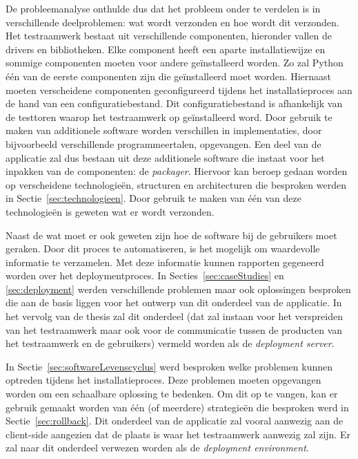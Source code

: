 De probleemanalyse onthulde dus dat het probleem onder te verdelen is in verschillende deelproblemen: wat wordt verzonden en hoe wordt dit verzonden.
Het testraamwerk bestaat uit verschillende componenten, hieronder vallen de drivers en bibliotheken.
Elke component heeft een aparte installatiewijze en sommige componenten moeten voor andere geïnstalleerd worden.
Zo zal Python één van de eerste componenten zijn die geïnstalleerd moet worden.
Hiernaast moeten verscheidene componenten geconfigureerd tijdens het installatieproces aan de hand van een configuratiebestand.
Dit configuratiebestand is afhankelijk van de testtoren waarop het testraamwerk op geïnstalleerd word.
Door gebruik te maken van additionele software worden verschillen in implementaties, door bijvoorbeeld verschillende programmeertalen, opgevangen.
Een deel van de applicatie zal dus bestaan uit deze additionele software die instaat voor het inpakken van de componenten: de \emph{packager}.
Hiervoor kan beroep gedaan worden op verscheidene technologieën, structuren en architecturen die besproken werden in Sectie~\ref{sec:technologieen}.
Door gebruik te maken van één van deze technologieën is geweten wat er wordt verzonden.

Naast de wat moet er ook geweten zijn hoe de software bij de gebruikers moet geraken.
Door dit proces te automatiseren, is het mogelijk om waardevolle informatie te verzamelen.
Met deze informatie kunnen rapporten gegeneerd worden over het deploymentproces.
In Secties~\ref{sec:caseStudies} en \ref{sec:deployment} werden verschillende problemen maar ook oplossingen besproken die aan de basis liggen voor het ontwerp van dit onderdeel van de applicatie. 
In het vervolg van de thesis zal dit onderdeel (dat zal instaan voor het verspreiden van het testraamwerk maar ook voor de communicatie tussen de producten van het testraamwerk en de gebruikers) vermeld worden als de \emph{deployment server}.

In Sectie~\ref{sec:softwareLevenscyclus} werd besproken welke problemen kunnen optreden tijdens het installatieproces.
Deze problemen moeten opgevangen worden om een schaalbare oplossing te bedenken.
Om dit op te vangen, kan er gebruik gemaakt worden van één (of meerdere) strategieën die besproken werd in Sectie~\ref{sec:rollback}.
Dit onderdeel van de applicatie zal vooral aanwezig aan de client-side aangezien dat de plaats is waar het testraamwerk aanwezig zal zijn.
Er zal naar dit onderdeel verwezen worden als de \emph{deployment environment}.

